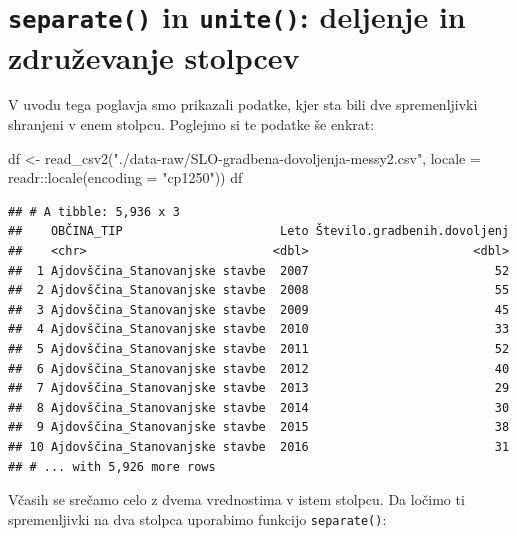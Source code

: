 \documentclass[
]{book}
\newenvironment{Shaded}{\begin{snugshade}}{\end{snugshade}}
\newcommand{\AttributeTok}[1]{\textcolor[rgb]{0.77,0.63,0.00}{#1}}
\newcommand{\FunctionTok}[1]{\textcolor[rgb]{0.00,0.00,0.00}{#1}}
\newcommand{\NormalTok}[1]{#1}
\newcommand{\OtherTok}[1]{\textcolor[rgb]{0.56,0.35,0.01}{#1}}
\newcommand{\SpecialCharTok}[1]{\textcolor[rgb]{0.00,0.00,0.00}{#1}}
\newcommand{\StringTok}[1]{\textcolor[rgb]{0.31,0.60,0.02}{#1}}
\begin{document}
\hypertarget{separate-in-unite-deljenje-in-zdruux17eevanje-stolpcev}{%
\section{\texorpdfstring{\texttt{separate()} in \texttt{unite()}: deljenje in združevanje stolpcev}{separate() in unite(): deljenje in združevanje stolpcev}}\label{separate-in-unite-deljenje-in-zdruux17eevanje-stolpcev}}

V uvodu tega poglavja smo prikazali podatke, kjer sta bili dve spremenljivki shranjeni v enem stolpcu. Poglejmo si te podatke še enkrat:

\begin{Shaded}
\begin{Highlighting}[]
\NormalTok{df }\OtherTok{\textless{}{-}} \FunctionTok{read\_csv2}\NormalTok{(}\StringTok{"./data{-}raw/SLO{-}gradbena{-}dovoljenja{-}messy2.csv"}\NormalTok{,}
                \AttributeTok{locale =}\NormalTok{ readr}\SpecialCharTok{::}\FunctionTok{locale}\NormalTok{(}\AttributeTok{encoding =} \StringTok{"cp1250"}\NormalTok{))}
\NormalTok{df}
\end{Highlighting}
\end{Shaded}

\begin{verbatim}
## # A tibble: 5,936 x 3
##    OBČINA_TIP                      Leto Število.gradbenih.dovoljenj
##    <chr>                          <dbl>                       <dbl>
##  1 Ajdovščina_Stanovanjske stavbe  2007                          52
##  2 Ajdovščina_Stanovanjske stavbe  2008                          55
##  3 Ajdovščina_Stanovanjske stavbe  2009                          45
##  4 Ajdovščina_Stanovanjske stavbe  2010                          33
##  5 Ajdovščina_Stanovanjske stavbe  2011                          52
##  6 Ajdovščina_Stanovanjske stavbe  2012                          40
##  7 Ajdovščina_Stanovanjske stavbe  2013                          29
##  8 Ajdovščina_Stanovanjske stavbe  2014                          30
##  9 Ajdovščina_Stanovanjske stavbe  2015                          38
## 10 Ajdovščina_Stanovanjske stavbe  2016                          31
## # ... with 5,926 more rows
\end{verbatim}

Včasih se srečamo celo z dvema vrednostima v istem stolpcu. Da ločimo ti spremenljivki na dva stolpca uporabimo funkcijo \texttt{separate()}:
\end{document}
